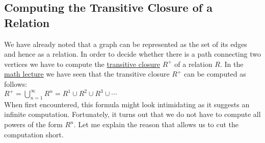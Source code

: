\subsection{Computing the Transitive Closure of a Relation}
We have already noted that a graph can be represented as the set of its edges and hence as a relation.
In order to decide whether there is a path connecting two vertices we have to compute the 
\href{https://en.wikipedia.org/wiki/Transitive_closure}{transitive closure} $R^+$ of a relation $R$.  
In the \href{https://github.com/karlstroetmann/Lineare-Algebra/blob/master/Script/lineare-algebra.pdf}{math lecture}
we have seen that the transitive closure $R^+$ can be computed as follows:
\\[0.2cm]
\hspace*{1.3cm}
$R^+ = \bigcup\limits_{n=1}^{\infty} R^n = R^1 \cup R^2 \cup R^3 \cup \cdots$  
\\[0.2cm]
When first encountered, this formula might look intimidating as it suggests an infinite computation.
Fortunately, it turns out that we do not have to compute all powers of the form $R^n$.  Let me
explain the reason that allows us to cut the computation short.  
